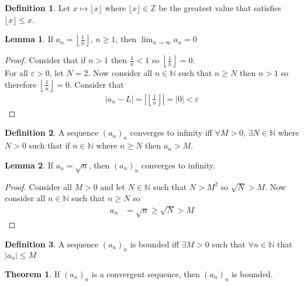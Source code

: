 \documentclass[12pt]{article}
\theoremstyle{definition}
\newtheorem{definition}{Definition}
\theoremstyle{definition}
\newtheorem{theorem}{Theorem}
\theoremstyle{definition}
\newtheorem{lemma}{Lemma}
\theoremstyle{definition}
\begin{document}
\begin{flushleft}
\begin{definition}
    Let $x \mapsto \lfloor x \rfloor$ where $\lfloor x \rfloor \in \mathbb{Z}$ be the greatest value that satisfies $\lfloor x \rfloor \leq x$.
\end{definition}

\begin{lemma}
    If $a_n = \left\lfloor\frac{1}{n}\right\rfloor$, $n \geq 1$, then $\lim_{n\to\infty} a_n = 0$
\end{lemma}
\begin{proof}
    Consider that if $n > 1$ then $\frac{1}{n} < 1$ so $\left\lfloor\frac{1}{n}\right\rfloor = 0$. \\
    For all $\varepsilon > 0$, let $N = 2$. Now consider all $n \in \mathbb{N}$ such that $n \geq N$ then $n > 1$ so therefore $\left\lfloor\frac{1}{n}\right\rfloor = 0$. Consider that
    \begin{align*}
        |a_n - L| = \left|\left\lfloor\frac{1}{n}\right\rfloor\right| = |0| < \varepsilon
    \end{align*}
\end{proof}

\begin{definition}
    A sequence $(a_n)_n$ converges to infinity iff $\forall M > 0$, $\exists N \in \mathbb{N}$ where $N > 0$ such that if $n \in \mathbb{N}$ where $n \geq N$ then $a_n > M$.
\end{definition}

\begin{lemma}
    If $a_n = \sqrt{n}$, then $(a_n)_n$ converges to infinity.
\end{lemma}
\begin{proof}
    Consider all $M > 0$ and let $N \in \mathbb{N}$ such that $N > M^2$ so $\sqrt{N} > M$.
    Now consider all $n \in \mathbb{N}$ such that $n \geq N$ so
    \begin{align*}
        a_n
        &= \sqrt{n}
        \geq \sqrt{N}
        > M
    \end{align*}
\end{proof}

\begin{definition}
    A sequence $(a_n)_n$ is bounded iff $\exists M > 0$ such that $\forall n \in \mathbb{N}$ that $|a_n| \leq M$
\end{definition}

\begin{theorem}
    If $(a_n)_n$ is a convergent sequence, then $(a_n)_n$ is bounded.
\end{theorem}

\end{flushleft}
\end{document}
